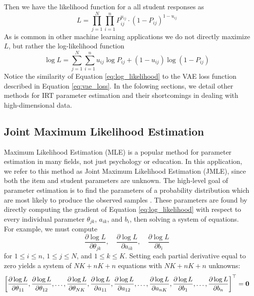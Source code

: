 Then we have the likelihood function \cite{baker_kim2004} for a all student responses as 
\begin{equation}
  L = \prod_{j=1}^N \prod_{i=1}^n P_{ij}^{u_{ij}} \cdot (1 - P_{ij})^{1- u_{ij}}
  \label{eq:likelihood}
\end{equation}
As is common in other machine learning applications we do not directly maximize $L$, but rather the log-likelihood function
\begin{equation}
  \log L = \sum_{j=1}^N \sum_{i=1}^n u_{ij} \log P_{ij} + (1-u_{ij})\log (1 - P_{ij})
  \label{eq:log_likelihood}
\end{equation}
Notice the similarity of Equation \ref{eq:log_likelihood} to the VAE loss function described in Equation \ref{eq:vae_loss}. In the folowing sections, we detail other methods for IRT parameter estimation and their shortcomings in dealing with high-dimensional data.


\subsection{Joint Maximum Likelihood Estimation} \label{sec:mle}
Maximum Likelihood Estimation (MLE) is a popular method for parameter estimation in many fields, not just psychology or education. In this application, we refer to this method as Joint Maximum Likelihood Estimation (JMLE), since both the item and student parameters are unknown. The high-level goal of parameter estimation is to find the parameters of a probability distribution which are most likely to produce the observed samples \cite{myung2003}. These parameters are found by directly computing the gradient of Equation \ref{eq:log_likelihood} with respect to every individual parameter $\theta_{jk}$, $a_{ik}$, and $b_i$, then solving a system of equations. For example, we must compute 
\[\frac{\partial \log L}{\partial \theta_{jk}}, \quad \frac{\partial \log L}{\partial a_{ik}}, \quad \frac{\partial \log L}{\partial b_i}\]
for $1 \leq i \leq n$, $1 \leq j \leq N$, and $1 \leq k \leq K$. Setting each partial derivative equal to zero yields a system of $NK + nK + n$ equations with $NK + nK + n$ unknowns:
\begin{equation}
  \left[ \frac{\partial \log L}{\partial \theta_{11}}, \frac{\partial \log L}{\partial \theta_{12}}, \ldots , \frac{\partial \log L}{\partial \theta_{NK}}, \frac{\partial \log L}{\partial a_{11}}, \frac{\partial \log L}{\partial a_{12}}, \ldots, \frac{\partial \log L}{\partial a_{nK}}, \frac{\partial \log L}{\partial b_1}, \ldots, \frac{\partial \log L}{\partial b_n}\right]^\top = \boldsymbol{0}
  \label{eq:solve_system}
\end{equation}

